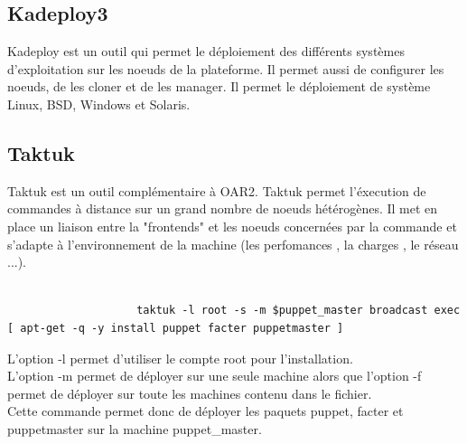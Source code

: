 \documentclass[a4paper, 10pt, onecolumn]{report}
\begin{document}
		\subsection{Kadeploy3}
			Kadeploy est un outil qui permet le déploiement des différents systèmes d'exploitation sur les noeuds de la plateforme. Il permet aussi de configurer les noeuds, de les cloner et de les manager. Il permet le déploiement de système Linux, BSD, Windows et Solaris.
		\subsection{Taktuk}
			Taktuk est un outil complémentaire à OAR2. Taktuk permet l'éxecution de commandes à distance sur un grand nombre de noeuds hétérogènes. Il met en place un liaison entre la "frontends" et les noeuds concernées par la commande et s'adapte  à l'environnement de la machine (les perfomances , la charges , le réseau ...). \\
			\\ 
			\begin{lstlisting}
					taktuk -l root -s -m $puppet_master broadcast exec [ apt-get -q -y install puppet facter puppetmaster ]
			\end{lstlisting}
			L'option -l permet d'utiliser le compte root pour l'installation.\\
			L'option -m permet de déployer sur une seule machine alors que l'option -f permet de déployer sur toute les machines contenu dans le fichier.\\
			Cette commande permet donc de déployer les paquets puppet, facter et puppetmaster sur la machine puppet\_master.
			
\end{document}
